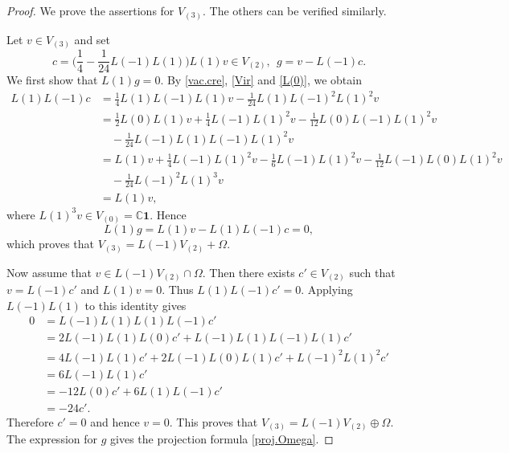 \documentclass[12pt]{article}
\numberwithin{equation}{section}
\theoremstyle{definition}
\theoremstyle{plain}
\newcommand{\bC}{\ensuremath{\mathbb{C}}}
\newcommand{\bone}{\mathbf{1 }}
\begin{document}
\begin{proof}
    We prove the assertions for $V_{(3)}$. The others can be verified similarly.

    Let $v\in V_{(3)}$ and set
    \begin{equation*}
        c=\Big(\frac14-\frac1{24}L(-1)L(1)\Big)L(1)v\in V_{(2)},\ \ g=v-L(-1)c.
    \end{equation*}
    We first show that $L(1)g=0$. By \eqref{vac.cre}, \eqref{Vir} and \eqref{L(0)}, we obtain
    \begin{align*}
        L(1)L(-1)c&=\frac14L(1)L(-1)L(1)v-\frac1{24}L(1)L(-1)^2L(1)^2v\\
        &=\frac12L(0)L(1)v+\frac14L(-1)L(1)^2v-\frac1{12}L(0)L(-1)L(1)^2v\\
        &\quad-\frac1{24}L(-1)L(1)L(-1)L(1)^2v\\
        &=L(1)v+\frac14L(-1)L(1)^2v-\frac16L(-1)L(1)^2v-\frac1{12}L(-1)L(0)L(1)^2v\\
        &\quad-\frac1{24}L(-1)^2L(1)^3v\\
        &=L(1)v,
    \end{align*}
    where $L(1)^3v\in V_{(0)}=\bC\bone$. Hence
    \begin{equation*}
        L(1)g=L(1)v-L(1)L(-1)c=0,
    \end{equation*}
    which proves that $V_{(3)}=L(-1)V_{(2)}+\Omega$.

    Now assume that $v\in L(-1)V_{(2)}\cap\Omega$. Then there exists $c'\in V_{(2)}$ such that $v=L(-1)c'$ and $L(1)v=0$. Thus $L(1)L(-1)c'=0$. Applying $L(-1)L(1)$ to this identity gives
    \begin{align*}
        0&=L(-1)L(1)L(1)L(-1)c'\\
        &=2L(-1)L(1)L(0)c'+L(-1)L(1)L(-1)L(1)c'\\
        &=4L(-1)L(1)c'+2L(-1)L(0)L(1)c'+L(-1)^2L(1)^2c'\\
        &=6L(-1)L(1)c'\\
        &=-12L(0)c'+6L(1)L(-1)c'\\
        &=-24c'.
    \end{align*}
    Therefore $c'=0$ and hence $v=0$. This proves that $V_{(3)}=L(-1)V_{(2)}\oplus\Omega$. The expression for $g$ gives the projection formula
    \eqref{proj.Omega}.
\end{proof}
\end{document}
